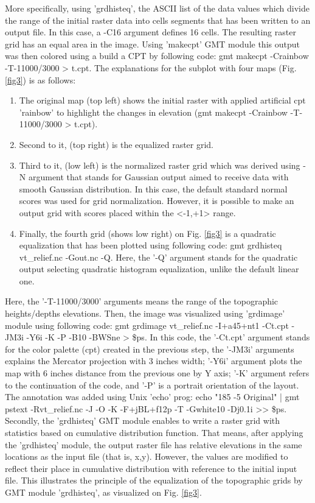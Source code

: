 \documentclass[USenglish]{article}
\begin{document}
More specifically, using 'grdhisteq', the ASCII list of the data values which divide the range of the initial raster data into cells segments that has been written to an output file. In this case, a -C16 argument defines 16 cells. The resulting raster grid has an equal area in the image. Using 'makecpt' GMT module this output was then colored using a build a CPT by following code: gmt makecpt -Crainbow -T-11000/3000 > t.cpt. The explanations for the subplot with four maps (Fig. \ref{fig3}) is as follows:
\begin{enumerate}
    \item The original map (top left) shows the initial raster with applied artificial cpt 'rainbow' to highlight the changes in elevation (gmt makecpt -Crainbow -T-11000/3000 > t.cpt). 
    \item Second to it, (top right) is the equalized raster grid.
    \item Third to it, (low left) is the normalized raster grid which was derived using -N argument that stands for Gaussian output aimed to receive data with smooth Gaussian distribution. In this case, the default standard normal scores was used for grid normalization. However, it is possible to make an output grid with scores placed within the <-1,+1> range. 
    \item Finally, the fourth grid (shows low right) on Fig. \ref{fig3} is a quadratic equalization that has been plotted using following code: gmt grdhisteq vt\_relief.nc -Gout.nc -Q. Here, the '-Q' argument stands for the quadratic output selecting quadratic histogram equalization, unlike the default linear one.
\end{enumerate}
Here, the '-T-11000/3000' arguments means the range of the topographic heights/depths elevations. Then, the image was visualized using 'grdimage' module using following code: gmt grdimage vt\_relief.nc -I+a45+nt1 -Ct.cpt -JM3i -Y6i -K -P -B10 -BWSne > \$ps. In this code, the '-Ct.cpt' argument stands for the color palette (cpt) created in the previous step, the '-JM3i' arguments explains the Mercator projection with 3 inches width; '-Y6i' argument plots the map with 6 inches distance from the previous one by Y axis; '-K' argument refers to the continuation of the code, and '-P' is a portrait orientation of the layout. The annotation was added using Unix 'echo' prog: echo "185 -5 Original" | gmt pstext -Rvt\_relief.nc -J -O -K -F+jBL+f12p -T -Gwhite\@10 -Dj0.1i >> \$ps. Secondly, the 'grdhisteq' GMT module enables to write a raster grid with statistics based on cumulative distribution function. That means, after applying the 'grdhisteq'  module, the output raster file has relative elevations in the same locations as the input file (that is, x,y). However, the values are modified to reflect their place in cumulative distribution with reference to the initial input file. This illustrates the principle of the equalization of the topographic grids by GMT module 'grdhisteq', as visualized on Fig. \ref{fig3}. 
\end{document}
